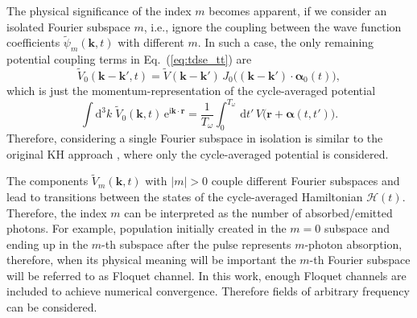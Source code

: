 \documentclass[
pra%
,preprint%
,amssymb, nobibnotes, aps, superscriptaddress, floatfix]{revtex4}
\renewcommand{\imath}{\mathrm{i}}
\newcommand{\dd}{\mathrm{d}}
\newcommand{\rv}{\mathbf{r}}
\newcommand{\av}{\boldsymbol{\alpha}}
\newcommand{\kv}{\mathbf{k}}
\newcommand{\CAHt}{$\mathcal{H}(t)$}
\newcommand{\psit}{\widetilde{\psi}}
\newcommand{\Vt}{\widetilde{V}}
\newcommand{\intK}{\int \dd^3 k}
\newcommand{\Vidx}[1]{\Vt_{#1}}
\newcommand{\Vmk}{\Vidx{m}(\kv, t)} %
\newcommand{\Vkp}{\Vt(\kv-\kv')} %
\newcommand{\Vkpo}{\Vidx{0}(\kv-\kv', t)} %
\newcommand{\Vko}{\Vidx{0}(\kv, t)} %
\newcommand{\Pidx}[1]{\psit_{#1}}
\newcommand{\Pmk}{\Pidx{m}(\kv, t)} %
\def\e#1{\mathrm{e}^{#1}}
\begin{document}
The physical significance of the index $m$ becomes apparent, if we consider an isolated Fourier subspace $m$, i.e., ignore the coupling between the wave function coefficients $\Pmk$ with different $m$. In such a case, the only remaining potential coupling terms in Eq.~(\ref{eq:tdse_tt}) are
\begin{equation}
\Vkpo = \Vkp \, J_{0}\big( (\kv-\kv') \cdot \av_0(t) \big),
\end{equation}
which is just the momentum-representation of the cycle-averaged potential
\begin{equation}
\intK \; \Vko \, \e{\imath \kv \cdot \rv} =  \frac{1}{T_\omega}\int_0^{T_\omega} \, \dd t' \, V\big(\rv + \av(t,t')\big). 
\end{equation}
Therefore, considering a single Fourier subspace in isolation is similar to the original KH approach \cite{Henneberger1968a}, where only the cycle-averaged potential is considered.

The components $\Vmk$ with $|m|>0$ couple different Fourier subspaces and lead to transitions between the states of the cycle-averaged Hamiltonian \CAHt. Therefore, the index $m$ can be interpreted as the number of absorbed/emitted photons. For example, population initially created in the $m=0$ subspace and ending up in the $m$-th subspace after the pulse represents $m$-photon absorption, therefore, when its physical meaning will be important the $m$-th Fourier subspace will be referred to as Floquet channel.
In this work, enough Floquet channels are included to achieve numerical convergence. Therefore fields of arbitrary frequency can be considered. 


\end{document}
